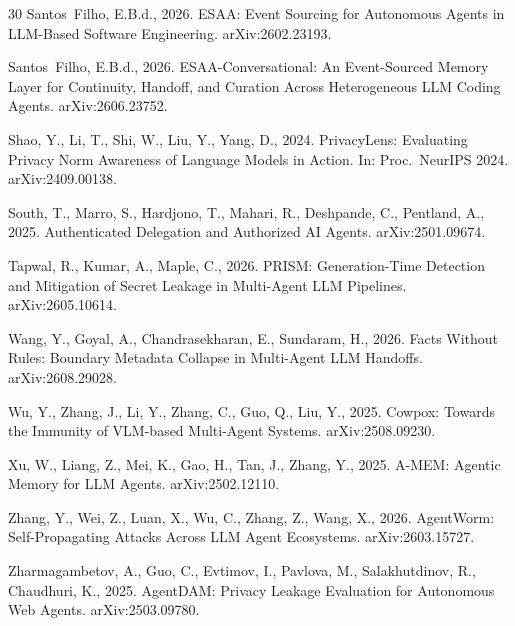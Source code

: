 \documentclass[preprint,12pt,authoryear]{elsarticle}
\begin{document}
\begin{thebibliography}{30}
Santos~Filho, E.B.d., 2026{}. ESAA: Event Sourcing for Autonomous Agents in LLM-Based Software Engineering. arXiv:2602.23193.

Santos~Filho, E.B.d., 2026{}. ESAA-Conversational: An Event-Sourced Memory Layer for Continuity, Handoff, and Curation Across Heterogeneous LLM Coding Agents. arXiv:2606.23752.

Shao, Y., Li, T., Shi, W., Liu, Y., Yang, D., 2024. PrivacyLens: Evaluating Privacy Norm Awareness of Language Models in Action. In: Proc.\ NeurIPS 2024. arXiv:2409.00138.

South, T., Marro, S., Hardjono, T., Mahari, R., Deshpande, C., Pentland, A., 2025. Authenticated Delegation and Authorized AI Agents. arXiv:2501.09674.

Tapwal, R., Kumar, A., Maple, C., 2026. PRISM: Generation-Time Detection and Mitigation of Secret Leakage in Multi-Agent LLM Pipelines. arXiv:2605.10614.

Wang, Y., Goyal, A., Chandrasekharan, E., Sundaram, H., 2026. Facts Without Rules: Boundary Metadata Collapse in Multi-Agent LLM Handoffs. arXiv:2608.29028.

Wu, Y., Zhang, J., Li, Y., Zhang, C., Guo, Q., Liu, Y., 2025. Cowpox: Towards the Immunity of VLM-based Multi-Agent Systems. arXiv:2508.09230.

Xu, W., Liang, Z., Mei, K., Gao, H., Tan, J., Zhang, Y., 2025. A-MEM: Agentic Memory for LLM Agents. arXiv:2502.12110.

Zhang, Y., Wei, Z., Luan, X., Wu, C., Zhang, Z., Wang, X., 2026. AgentWorm: Self-Propagating Attacks Across LLM Agent Ecosystems. arXiv:2603.15727.

Zharmagambetov, A., Guo, C., Evtimov, I., Pavlova, M., Salakhutdinov, R., Chaudhuri, K., 2025. AgentDAM: Privacy Leakage Evaluation for Autonomous Web Agents. arXiv:2503.09780.

\end{thebibliography}
\end{document}
